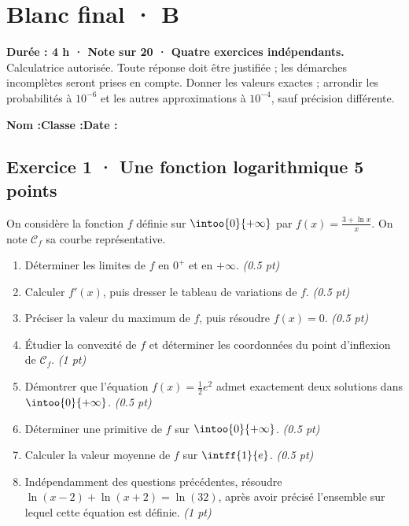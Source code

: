 \fi

\fi

\ifmxteacher

\mxnewpage{}\label{sujet:9-4}

\section*{Blanc final · B}


\textbf{Durée : 4 h · Note sur 20 · Quatre exercices indépendants.}\\Calculatrice autorisée. Toute réponse doit être justifiée ; les démarches incomplètes seront prises en compte. Donner les valeurs exactes ; arrondir les probabilités à $10^{-6}$ et les autres approximations à $10^{-4}$, sauf précision différente.

\smallskip\textbf{Nom :}\enspace\dotfill\quad\textbf{Classe :}\enspace\dotfill\quad\textbf{Date :}\enspace\dotfill

\subsection*{Exercice 1 · Une fonction logarithmique \hfill 5 points}On considère la fonction $f$ définie sur $\intoo{0}{+\infty}$ par $f(x)=\frac{3+\ln x}x$. On note $\mathcal C_f$ sa courbe représentative.

\begin{enumerate}

\item Déterminer les limites de $f$ en $0^+$ et en $+\infty$. \hfill\textit{(\num{0,5} pt)}

\item Calculer $f' (x)$, puis dresser le tableau de variations de $f$. \hfill\textit{(\num{0,5} pt)}

\item Préciser la valeur du maximum de $f$, puis résoudre $f(x)=0$. \hfill\textit{(\num{0,5} pt)}

\item Étudier la convexité de $f$ et déterminer les coordonnées du point d'inflexion de $\mathcal C_f$. \hfill\textit{(1 pt)}

\item Démontrer que l'équation $f(x)=\frac12 e^{2}$ admet exactement deux solutions dans $\intoo{0}{+\infty}$. \hfill\textit{(\num{0,5} pt)}

\item Déterminer une primitive de $f$ sur $\intoo{0}{+\infty}$. \hfill\textit{(\num{0,5} pt)}

\item Calculer la valeur moyenne de $f$ sur $\intff{1}{e}$. \hfill\textit{(\num{0,5} pt)}

\item Indépendamment des questions précédentes, résoudre $\ln(x-2)+\ln(x+2)=\ln(32)$, après avoir précisé l'ensemble sur lequel cette équation est définie. \hfill\textit{(1 pt)}

\end{enumerate}

